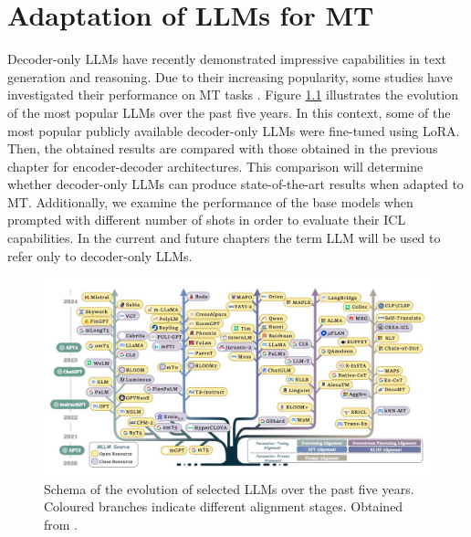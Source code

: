 \documentclass[11pt,english,listoffigures,listoftables]{tfgetsinf}
\begin{document}
\chapter{Adaptation of LLMs for MT}
\label{chapter4}


Decoder-only LLMs have recently demonstrated impressive capabilities in text generation and reasoning. Due to their increasing popularity, some studies have investigated their performance on MT tasks \cite{zhang2023prompting} \cite{vilar2022prompting} \cite{hendy2023good}. Figure \ref{fig:llms} illustrates the evolution of the most popular LLMs over the past five years. In this context, some of the most popular publicly available decoder-only LLMs were fine-tuned using LoRA. Then, the obtained results are compared with those obtained in the previous chapter for encoder-decoder architectures. This comparison will determine whether decoder-only LLMs can produce state-of-the-art results when adapted to MT. Additionally, we examine the performance of the base models when prompted with different number of shots in order to evaluate their ICL capabilities. In the current and future chapters the term LLM will be used to refer only to decoder-only LLMs. 


\begin{figure}[h]
    \centering
    \includegraphics[width=1\linewidth]{llms.jpeg}
    \caption{Schema of the evolution of selected LLMs over the past five years. Coloured branches indicate different alignment stages. Obtained from \cite{qin2024multilingual}.}
    \label{fig:llms}
\end{figure}
\end{document}
